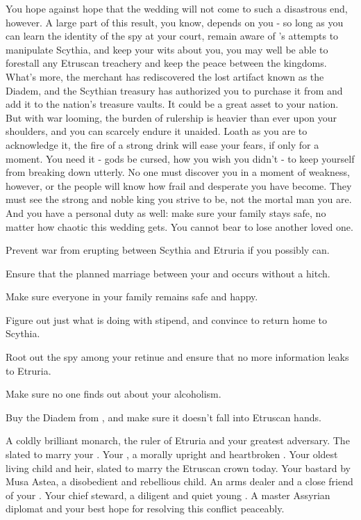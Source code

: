 \documentclass[char]{Kos}
\begin{document}
You hope against hope that the wedding will not come to such a disastrous end, however. A large part of this result, you know, depends on you - so long as you can learn the identity of the spy at your court, remain aware of \cEtruriaKing{}'s attempts to manipulate Scythia, and keep your wits about you, you may well be able to forestall any Etruscan treachery and keep the peace between the kingdoms. What's more, the merchant \cMerchant{} has rediscovered the lost artifact known as the Diadem, and the Scythian treasury has authorized you to purchase it from \cMerchant{\them} and add it to the nation's treasure vaults. It could be a great asset to your nation. But with war looming, the burden of rulership is heavier than ever upon your shoulders, and you can scarcely endure it unaided. Loath as you are to acknowledge it, the fire of a strong drink will ease your fears, if only for a moment. You need it - gods be cursed, how you wish you didn't - to keep yourself from breaking down utterly. No one must discover you in a moment of weakness, however, or the people will know how frail and desperate you have become. They must see the strong and noble king you strive to be, not the mortal man you are. And you have a personal duty as well: make sure your family stays safe, no matter how chaotic this wedding gets. You cannot bear to lose another loved one.

\begin{itemz}[Goals]
\item Prevent war from erupting between Scythia and Etruria if you possibly can.
\item Ensure that the planned marriage between your \cBride{\offspring} and \cGroom{} occurs without a hitch.
\item Make sure everyone in your family remains safe and happy.
\item Figure out just what \cWard{} is doing with \cWard{\their} stipend, and convince \cWard{\them} to return home to Scythia.
\item Root out the spy among your retinue and ensure that no more information leaks to Etruria.
\item Make sure no one finds out about your alcoholism.
\item Buy the Diadem from \cMerchant{}, and make sure it doesn't fall into Etruscan hands.
\end{itemz}

\begin{contacts}
\contact{\cEtruriaKing{}} A coldly brilliant monarch, the ruler of Etruria and your greatest adversary.
\contact{\cGroom{}} The \cGroom{\human} slated to marry your \cBride{\offspring}.
\contact{\cScythiaQueen{}} Your \cScythiaQueen{\spouse}, a morally upright and heartbroken \cScythiaQueen{\human}.
\contact{\cBride{}} Your oldest living child and heir, slated to marry the Etruscan crown  today.
\contact{\cWard{}} Your bastard \cWard{\offspring} by Musa Astea, a disobedient and rebellious child.
\contact{\cArmsDealer{}} An arms dealer and a close friend of your \cScythiaQueen{\spouse}.
\contact{\cButler{}} Your chief steward, a diligent and quiet young \cButler{\human}.
 A master Assyrian diplomat and your best hope for resolving this conflict peaceably.
\end{contacts}
\end{document}
